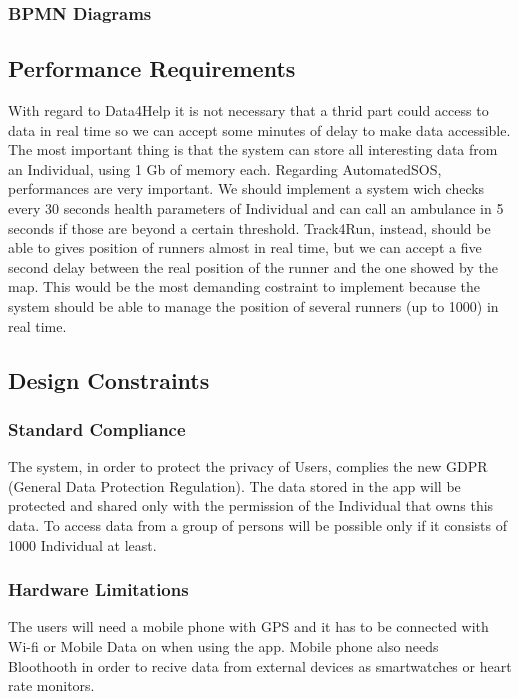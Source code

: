 \documentclass[12pt]{article}
\begin{document}
        
                  
        

        
         

\subsubsection{BPMN Diagrams}

\newpage


\subsection{Performance Requirements}
With regard to Data4Help it is not necessary that a thrid part could access to data in real time so we can accept some minutes of delay to make data accessible. The most important thing is that the system can store all interesting data from an Individual, using 1 Gb of memory each. Regarding AutomatedSOS, performances are very important. We should implement a system wich checks every 30 seconds health parameters of Individual and can call an ambulance in 5 seconds if those are beyond a certain threshold. Track4Run, instead, should be able to gives position of runners almost in real time, but we can accept a five second delay between the real position of the runner and the one showed by the map. This would be the most demanding costraint to implement because the system should be able to manage the position of several runners (up to 1000) in real time. 


\subsection{Design Constraints}
\subsubsection{Standard Compliance}
The system, in order to protect the privacy of Users, complies the new GDPR (General Data Protection Regulation). The data stored in the app will be protected and shared only with the permission of the Individual that owns this data. To access data from a group of persons will be possible only if it consists of 1000 Individual at least. 

\subsubsection{Hardware Limitations}
The users will need a mobile phone with GPS and it has to be connected with Wi-fi or Mobile Data on when using the app. Mobile phone also needs Bloothooth in order to recive data from external devices as smartwatches or heart rate monitors.   
\end{document}
